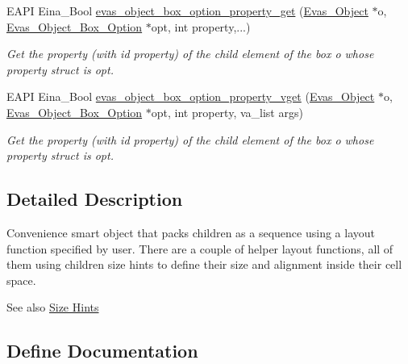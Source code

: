 \begin{DoxyCompactItemize}
EAPI Eina\_\-Bool \hyperlink{group__Evas__Object__Box_ga688c2cd7e2901fd491ff3b4a78dace89}{evas\_\-object\_\-box\_\-option\_\-property\_\-get} (\hyperlink{group__Evas__Object__Group_ga9e19e6dd1f517a0ba437c0114d3e7c97}{Evas\_\-Object} $\ast$o, \hyperlink{group__Evas__Object__Box_gabbeb05bf47aaf7681e9d83a1b0055d20}{Evas\_\-Object\_\-Box\_\-Option} $\ast$opt, int property,...)
\begin{DoxyCompactList}\small\item\em Get the property (with id {\itshape property\/}) of the child element of the box {\itshape o\/} whose property struct is {\itshape opt\/}. \item\end{DoxyCompactList}\item 
EAPI Eina\_\-Bool \hyperlink{group__Evas__Object__Box_ga987c048602d55d921c250d1cc57b5873}{evas\_\-object\_\-box\_\-option\_\-property\_\-vget} (\hyperlink{group__Evas__Object__Group_ga9e19e6dd1f517a0ba437c0114d3e7c97}{Evas\_\-Object} $\ast$o, \hyperlink{group__Evas__Object__Box_gabbeb05bf47aaf7681e9d83a1b0055d20}{Evas\_\-Object\_\-Box\_\-Option} $\ast$opt, int property, va\_\-list args)
\begin{DoxyCompactList}\small\item\em Get the property (with id {\itshape property\/}) of the child element of the box {\itshape o\/} whose property struct is {\itshape opt\/}. \item\end{DoxyCompactList}\end{DoxyCompactItemize}


\subsection{Detailed Description}
Convenience smart object that packs children as a sequence using a layout function specified by user. There are a couple of helper layout functions, all of them using children size hints to define their size and alignment inside their cell space.

\begin{DoxySeeAlso}{See also}
\hyperlink{group__Evas__Object__Group__Size__Hints}{Size Hints} 
\end{DoxySeeAlso}


\subsection{Define Documentation}
